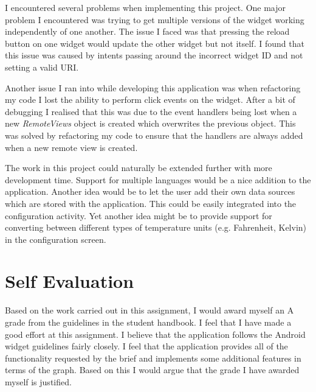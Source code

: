 \documentclass[paper=a4, fontsize=11pt]{scrartcl}	%
\numberwithin{equation}{section}															%
\numberwithin{figure}{section}																%
\numberwithin{table}{section}
\begin{document}
I encountered several problems when implementing this project. One major problem I encountered was trying to get multiple versions of the widget working independently of one another. The issue I faced was that pressing the reload button on one widget would update the other widget but not itself. I found that this issue was caused by intents passing around the incorrect widget ID and not setting a valid URI.

Another issue I ran into while developing this application was when refactoring my code I lost the ability to perform click events on the widget. After a bit of debugging I realised that this was due to the event handlers being lost when a new \textit{RemoteViews} object is created which overwrites the previous object. This was solved by refactoring my code to ensure that the handlers are always added when a new remote view is created.

The work in this project could naturally be extended further with more development time. Support for multiple languages would be a nice addition to the application. Another idea would be to let the user add their own data sources which are stored with the application. This could be easily integrated into the configuration activity. Yet another idea might be to provide support for converting between different types of temperature units (e.g. Fahrenheit, Kelvin) in the configuration screen.

\section{Self Evaluation}
Based on the work carried out in this assignment, I would award myself an A grade from the guidelines in the student handbook. I feel that I have made a good effort at this assignment. I believe that the application follows the Android widget guidelines fairly closely. I feel that the application provides all of the functionality requested by the brief and implements some additional features in terms of the graph. Based on this I would argue that the grade I have awarded myself is justified.

\clearpage
\end{document}
